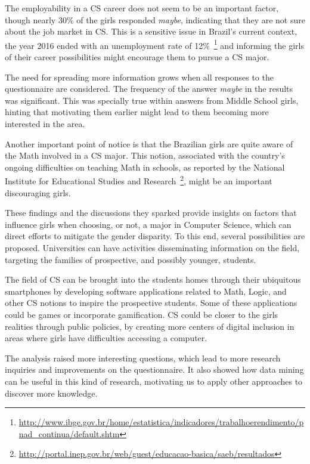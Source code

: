 The employability in a CS career does not seem to be an important factor, though nearly 30\% of the girls responded \emph{maybe}, indicating that they are not sure about the job market in CS. This is a sensitive issue in Brazil's current context, the year 2016 ended with an unemployment rate of 12\%~\footnote{\url{http://www.ibge.gov.br/home/estatistica/indicadores/trabalhoerendimento/pnad_continua/default.shtm}} and informing the girls of their career possibilities might encourage them to pursue a CS major.

The need for spreading more information grows when all responses to the questionnaire are considered. The frequency of the answer \emph{maybe} in the results was significant.  This was specially true within answers from Middle School girls, hinting that motivating them earlier might lead to them becoming more interested in the area.

Another important point of notice is that the Brazilian girls are quite aware of the Math involved in a CS major. This notion, associated with the country's ongoing difficulties on teaching Math in schools, as reported by the National Institute for Educational Studies and Research~\footnote{\url{http://portal.inep.gov.br/web/guest/educacao-basica/saeb/resultados}}, might be an important discouraging girls.

These findings and the discussions they sparked provide insights on factors that influence girls when choosing, or not, a major in Computer Science, which can direct efforts to mitigate the gender disparity. To this end, several possibilities are proposed. Universities can have activities disseminating information on the field, targeting the families of prospective, and possibly younger, students.

The field of CS can be brought into the students homes through their ubiquitous smartphones by developing software applications related to Math, Logic, and other CS notions to inspire the prospective students. Some of these  applications could be games or incorporate gamification. CS could be closer to the girls realities through public policies, by creating more centers of digital inclusion in areas where girls have difficulties accessing a computer.

The analysis raised more interesting questions, which lead to more research inquiries and improvements on the questionnaire. It also showed how data mining can be useful in this kind of research, motivating us to apply other approaches to discover more knowledge.